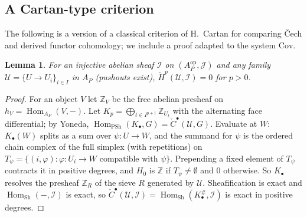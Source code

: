 \documentclass[11pt]{article}
\newtheorem{lemma}[theorem]{Lemma}
\theoremstyle{definition}
\theoremstyle{remark}
\newcommand{\Z}{\mathbb{Z}}
\newcommand{\Hom}{\operatorname{Hom}}
\newcommand{\Cov}{\mathrm{Cov}}
\newcommand{\cJ}{\mathcal{J}}
\newcommand{\cU}{\mathcal{U}}
\newcommand{\cI}{\mathcal{I}}
\newcommand{\Sh}{\operatorname{Sh}}
\newcommand{\PSh}{\operatorname{PSh}}
\begin{document}
\subsection{A Cartan-type criterion}
The following is a version of a classical criterion of H.~Cartan for comparing Čech and derived functor cohomology; we include a proof adapted to the system $\Cov$.

\begin{lemma}\label{lem:fact}
For an injective abelian sheaf $\cI$ on $(A_P^{\mathrm{op}},\cJ)$ and any family $\cU=\{U\to U_i\}_{i\in I}$ in $A_P$ (pushouts exist), $\check H^p(\cU,\cI)=0$ for $p>0$.
\end{lemma}
\begin{proof}
For an object $V$ let $\Z_V$ be the free abelian presheaf on $h_V=\Hom_{A_P}(V,-)$. Let $K_p=\bigoplus_{t\in I^{p+1}}\Z_{U_t}$ with the alternating face differential; by Yoneda, $\Hom_{\PSh}(K_\bullet,G)=\check C^\bullet(\cU,G)$. Evaluate at $W$: $K_\bullet(W)$ splits as a sum over $\psi\colon U\to W$, and the summand for $\psi$ is the ordered chain complex of the full simplex (with repetitions) on $T_\psi=\{(i,\varphi):\varphi\colon U_i\to W\text{ compatible with }\psi\}$. Prepending a fixed element of $T_\psi$ contracts it in positive degrees, and $H_0$ is $\Z$ if $T_\psi\neq\emptyset$ and $0$ otherwise. So $K_\bullet$ resolves the presheaf $\Z_R$ of the sieve $R$ generated by $\cU$. Sheafification is exact and $\Hom_{\Sh}(-,\cI)$ is exact, so $\check C^\bullet(\cU,\cI)=\Hom_{\Sh}(K_\bullet^\#,\cI)$ is exact in positive degrees.
\end{proof}
\end{document}
